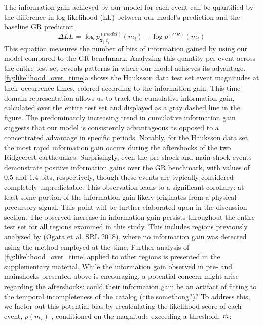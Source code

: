 \documentclass[pdflatex]{sn-jnl}
\begin{document}
The information gain achieved by our model for each event can be quantified by the difference in log-likelihood (LL) between our model's prediction and the baseline GR predictor:
\begin{equation}
    \Delta LL = \log{p_{\pmb{x_i}, t_i}^{(model)}(m_i)} - \log{p^{(GR)}(m_i)}
    \label{eq:information_gain}
\end{equation}
This equation measures the number of bits of information gained by using our model compared to the GR benchmark. Analyzing this quantity per event across the entire test set reveals patterns in where our model achieves its advantage. \ref{fig:likelihood_over_time}a shows the Hauksson data test set event magnitudes at their occurrence times, colored according to the information gain. This time-domain representation allows us to track the cumulative information gain, calculated over the entire test set and displayed as a gray dashed line in the figure. The predominantly increasing trend in cumulative information gain suggests that our model is consistently advantageous as opposed to a concentrated advantage in specific periods. Notably, for the Hauksson data set, the most rapid information gain occurs during the aftershocks of the two Ridgecrest earthquakes. Surprisingly, even the pre-shock and main shock events demonstrate positive information gains over the GR benchmark, with values of $0.5$ and $1.4$ bits, respectively, though these events are typically considered completely unpredictable. This observation leads to a significant corollary: at least some portion of the information gain likely originates from a physical precursory signal. This point will be further elaborated upon in the discussion section.
\newline
The observed increase in information gain persists throughout the entire test set for all regions examined in this study. This includes regions previously analyzed by (Ogata et al. SRL 2018), where no information gain was detected using the method employed at the time. Further analysis of \ref{fig:likelihood_over_time} applied to other regions is presented in the supplementary material.
\newline
While the information gain observed in pre- and mainshocks presented above is encouraging, a potential concern might arise regarding the aftershocks: could their information gain be an artifact of fitting to the temporal incompleteness of the catalog (cite somethong?)? To address this, we factor out this potential bias by recalculating the likelihood score of each event, $p(m_i)$ , conditioned on the magnitude exceeding a threshold, $\Tilde{m}$:
\end{document}

